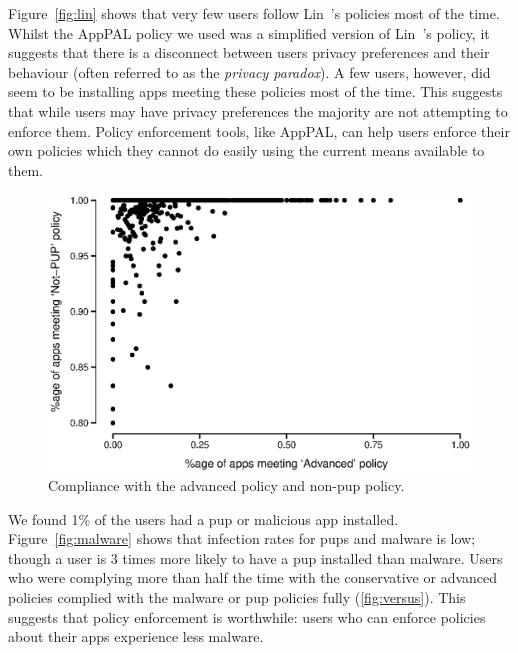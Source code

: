 \documentclass[]{llncs}
\begin{document}
Figure~\ref{fig:lin} shows that very few users follow Lin~\etal's policies most of the time.
Whilst the AppPAL policy we used was a simplified version of Lin~\etal's policy, it suggests that there is a disconnect between users privacy preferences and their behaviour (often referred to as the \emph{privacy paradox}).
A few users, however, did seem to be installing apps meeting these policies most of the time.
This suggests that while users may have privacy preferences the majority are not attempting to enforce them.
Policy enforcement tools, like AppPAL, can help users enforce their own policies which they cannot do easily using the current means available to them.

\begin{figure}\centering
  \includegraphics[width=0.5\linewidth]{./figures/c_v_pup.eps}
  \caption{Compliance with the advanced policy and non-\ac{pup} policy.}
  \label{fig:versus}
\end{figure}

We found 1\% of the users had a \ac{pup} or malicious app installed.
Figure~\ref{fig:malware} shows that infection rates for \ac{pup}s and malware is low;
though a user is 3 times more likely to have a \ac{pup} installed than malware.
Users who were complying more than half the time with the conservative or advanced policies complied with the malware or \ac{pup} policies fully (\autoref{fig:versus}).
This suggests that policy enforcement is worthwhile: users who can enforce policies about their apps experience less malware.
\end{document}
